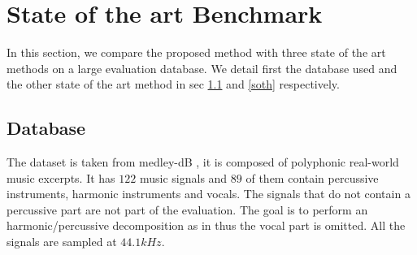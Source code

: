 \documentclass[journal]{IEEEtran}
\begin{document}
%   
%
%
%



\section{State of the art Benchmark}\label{sec:stateoftheart}

In this section, we compare the proposed method with three state of the art methods on a large evaluation database. We detail first the database used and the other state of the art method in sec \ref{database} and \ref{soth} respectively.  


\subsection{Database}\label{database}

The dataset is taken from medley-dB \cite{bittner2014medleydb}, it is composed of polyphonic real-world music excerpts. It has $122$ music signals and $89$ of them contain percussive instruments, harmonic instruments and vocals. The signals that do not contain a percussive part are not part of the evaluation. The goal is to perform an harmonic/percussive decomposition as in \cite{canadas2014percussive} thus the vocal part is omitted. All the signals are sampled at $44.1kHz$.
\end{document}

